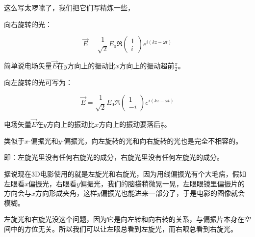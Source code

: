 \begin{enumerate}
这么写太啰嗦了，我们把它们写精炼一些，

向右旋转的光：

\begin{equation}
\vec E = \frac{1}{\sqrt{2}} E_0 \Re \left(
\begin{array}{c}
1 \\  i
\end{array}
\right) e^{i (kz - \omega t)}
\end{equation}

简单说电场矢量$\vec E$在$y$方向上的振动比$x$方向上的振动超前$\frac{\pi}{2}$。

向左旋转的光可写为：

\begin{equation}
\vec E = \frac{1}{\sqrt{2}} E_0 \Re \left(
\begin{array}{c}
1 \\ - i
\end{array}
\right) e^{i (kz - \omega t)}
\end{equation}

电场矢量$\vec E$在$y$方向上的振动比$x$方向上的振动要落后$\frac{\pi}{2}$。

类似于$x$-偏振光和$y$-偏振光，向左旋转的光和向右旋转的光也是完全不相容的。

即：左旋光里没有任何右旋光的成分，右旋光里没有任何左旋光的成分。

据说现在3D电影使用的就是左旋光和右旋光，因为用线偏振光有个大毛病，假如左眼看$x$偏振光，右眼看$y$偏振光，我们的脑袋稍微晃一晃，左眼眼镜里偏振片的方向会与$x$方向形成夹角，这样$y$偏振光也能进来一部分了，于是电影的图像就会模糊。

左旋光和右旋光没这个问题，因为它是向左转和向右转的关系，与偏振片本身在空间中的方位无关。所以我们可以让左眼总看到左旋光，而右眼总看到右旋光。


\end{enumerate}

